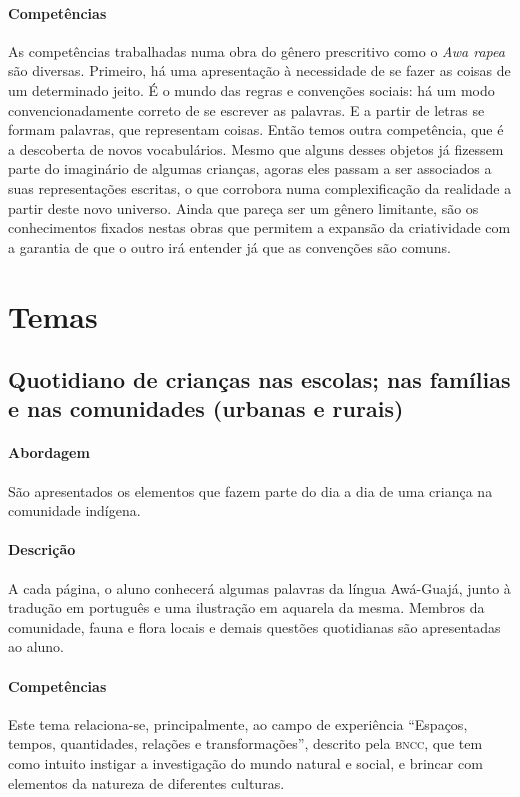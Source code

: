 \documentclass[11pt]{extarticle}
\begin{document}
{{%
\paragraph{Competências} 
As competências trabalhadas numa obra do gênero prescritivo como o 
\emph{Awa rapea} são diversas. 
Primeiro, há uma apresentação à necessidade de se fazer as coisas de um 
determinado jeito. É o mundo das regras e convenções sociais: há um modo 
convencionadamente correto de se escrever as palavras. E a partir de letras 
se formam palavras, que representam coisas. Então temos outra competência, 
que é a descoberta de novos vocabulários. Mesmo que alguns desses objetos já 
fizessem parte do imaginário de algumas crianças, agoras eles passam
a ser associados a suas representações escritas, o que corrobora numa complexificação
da realidade a partir deste novo universo. Ainda que pareça ser um gênero
limitante, são os conhecimentos fixados nestas obras que permitem a expansão
da criatividade com a garantia de que o outro irá entender já que as convenções são comuns.

\section{Temas}

\subsection{Quotidiano de crianças nas escolas; nas famílias e nas comunidades (urbanas e rurais)}

\paragraph{Abordagem} 
São apresentados os elementos que fazem parte do dia a dia de uma criança na comunidade indígena.
\paragraph{Descrição} 
A cada página, o aluno conhecerá algumas palavras da língua Awá-Guajá, junto à tradução em português
e uma ilustração em aquarela da mesma. Membros da comunidade, fauna e flora locais e demais questões
quotidianas são apresentadas ao aluno.
\paragraph{Competências} 
Este tema relaciona-se, principalmente, ao campo de experiência ``Espaços, tempos, quantidades, relações e transformações'',
descrito pela \textsc{bncc}, que tem como intuito instigar a investigação
do mundo natural e social, e brincar com elementos da natureza de diferentes culturas.


}}
\end{document}

